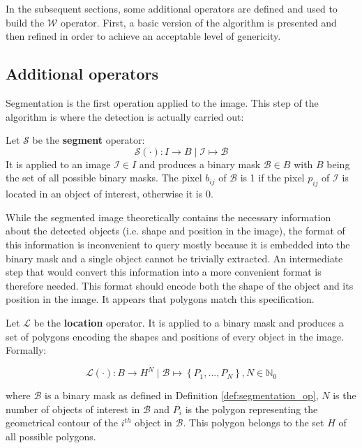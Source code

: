 In the subsequent sections, some additional operators are defined and used to build the $\mathcal{W}$ operator. First, a basic version of the algorithm is presented and then refined in order to achieve an acceptable level of genericity.

\subsection{Additional operators}
\label{ssec:other_operators}

Segmentation is the first operation applied to the image. This step of the algorithm is where the detection is actually carried out:
 
\begin{definition} \label{def:segmentation_op}
Let $\mathcal{S}$ be the \textbf{segment} operator:
\begin{equation}
	\label{eqn:operator_segment}
	\mathcal{S}(\cdot) : I \rightarrow B \mid \mathcal{I} \mapsto \mathcal{B}
\end{equation}
It is applied to an image $\mathcal{I} \in I$ and produces a binary mask $\mathcal{B} \in B$ with $B$ being the set of all possible binary masks. The pixel $b_{ij}$ of $\mathcal{B}$ is 1 if the pixel $p_{ij}$ of $\mathcal{I}$ is located in an object of interest, otherwise it is 0.
\end{definition}

While the segmented image theoretically contains the necessary information about the detected objects (i.e. shape and position in the image), the format of this information is inconvenient to query mostly because it is embedded into the binary mask and a single object cannot be trivially extracted. An intermediate step that would convert this information into a more convenient format is therefore needed. This format should encode both the shape of the object and its position in the image. It appears that polygons match this specification. 

\begin{definition} \label{def:locate_op}
Let $\mathcal{L}$ be the \textbf{location} operator. It is applied to a binary mask and produces a set of polygons encoding the shapes and positions of every object in the image. Formally:

\begin{equation}
	\mathcal{L}(\cdot) : B \rightarrow H^N \mid \mathcal{B} \mapsto \left\{P_1,  ..., P_N\right\}, N \in \mathbb{N}_0
\end{equation}

where $\mathcal{B}$ is a binary mask as defined in Definition \ref{def:segmentation_op}, $N$ is the number of objects of interest in $\mathcal{B}$ and $P_i$ is the polygon representing the geometrical contour of the $i^{th}$ object in $\mathcal{B}$. This polygon belongs to the set $H$ of all possible polygons.
\end{definition}

